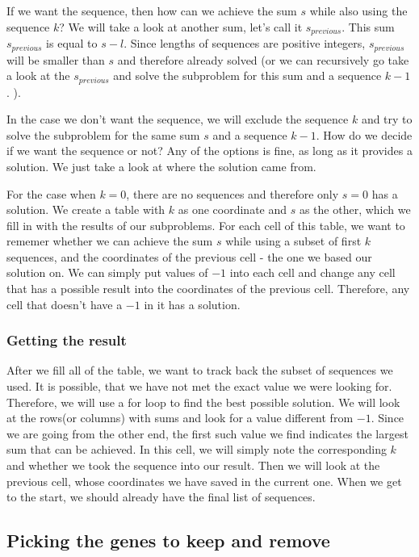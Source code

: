 If we want the sequence, then how can we achieve 
the sum $s$ while also using the sequence $k$? We will take a look at another sum, let's call it $s_{previous}$. This sum $s_{previous}$ is equal to $s - l$. Since lengths of sequences are positive integers, $s_{previous}$ will be 
smaller than $s$ and therefore already solved (or we can recursively go take a look at the $s_{previous}$ and solve the subproblem for this sum and a sequence $k-1$. ). 

In the case we don't want the sequence, we will exclude the sequence $k$ and try to solve the subproblem for the same sum $s$ and a sequence $k-1$. 
How do we decide if we want the sequence or not? Any of the options is fine, as long as it provides a solution. We just take a look at where the solution came from. 

For the case when $k = 0$, there are no sequences and therefore only $s = 0$ has a solution. 
We create a table with $k$ as one coordinate and $s$ as the other, which we fill in with the results of our subproblems. For each cell of this table, we want to rememer whether 
we can achieve the sum $s$ while using a subset of first $k$ sequences, and the coordinates of the previous cell - the one we based our solution on. 
We can simply put values of $-1$ into each cell and change any cell that has a possible result into the coordinates of the previous cell. Therefore, any cell that doesn't have 
a $-1$ in it has a solution. 

\subsubsection{Getting the result}
After we fill all of the table, we want to track back the subset of sequences we used. It is possible, that we have not met the exact value we were looking for. Therefore, we will 
use a for loop to find the best possible solution. We will look at the rows(or columns) with sums and look for a value different from $-1$. Since we are going from the other end, the first such 
value we find indicates the largest sum that can be achieved. 
In this cell, we will simply note the corresponding $k$ and whether we took the sequence into our result. Then we will look at the previous cell, whose coordinates we have saved in the 
current one. When we get to the start, we should already have the final list of sequences. 


\subsection{Picking the genes to keep and remove}

